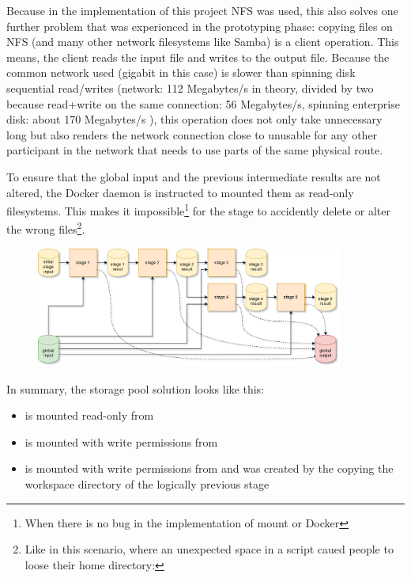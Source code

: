 Because in the implementation of this project NFS was used, this also solves one further problem that was experienced in the prototyping phase: copying files on NFS (and many other network filesystems like Samba) is a client operation.
This means, the client reads the input file and writes to the output file.
Because the common network used (gigabit in this case) is slower than spinning disk sequential read/writes (network: 112 Megabytes/s in theory, divided by two because read+write on the same connection: 56 Megabytes/s, spinning enterprise disk: about 170 Megabytes/s ), this operation does not only take unnecessary long but also renders the network connection close to unusable for any other participant in the network that needs to use parts of the same physical route.

To ensure that the global input and the previous intermediate results are not altered, the Docker daemon is instructed to mounted them as read-only filesystems.
This makes it impossible\footnote{When there is no bug in the implementation of mount or Docker} for the stage to accidently delete or alter the wrong files\footnote{Like in this scenario, where an unexpected space in a script caued people to loose their home directory: }.


\begin{figure}[H]
	\centering
	\includegraphics[width=0.9\textwidth]{stage-storage.png}
\end{figure}

In summary, the storage pool solution looks like this:

\begin{itemize}
	\item {} is mounted read-only from 
	\item {} is mounted with write permissions from 
	\item {} is mounted with write permissions from  and was created by the copying the workspace directory of the logically previous stage
\end{itemize}

